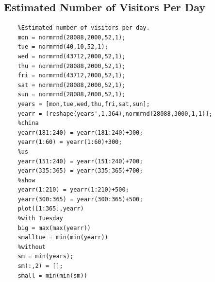 \begin{appendices}
\subsection{Estimated Number of Visitors Per Day}      
\lstset{language=Matlab}
        
\begin{lstlisting}
    %Estimated number of visitors per day.
    mon = normrnd(28088,2000,52,1);
    tue = normrnd(40,10,52,1);
    wed = normrnd(43712,2000,52,1);
    thu = normrnd(28088,2000,52,1);
    fri = normrnd(43712,2000,52,1);
    sat = normrnd(28088,2000,52,1);
    sun = normrnd(28088,2000,52,1);
    years = [mon,tue,wed,thu,fri,sat,sun];
    yearr = [reshape(years',1,364),normrnd(28088,3000,1,1)];
    %china
    yearr(181:240) = yearr(181:240)+300;
    yearr(1:60) = yearr(1:60)+300;
    %us
    yearr(151:240) = yearr(151:240)+700;
    yearr(335:365) = yearr(335:365)+700;
    %show
    yearr(1:210) = yearr(1:210)+500;
    yearr(300:365) = yearr(300:365)+500;
    plot([1:365],yearr)
    %with Tuesday
    big = max(max(yearr))
    smalltue = min(min(yearr))
    %without
    sm = min(years);
    sm(:,2) = [];
    small = min(min(sm))
\end{lstlisting}
      
  \end{appendices}


